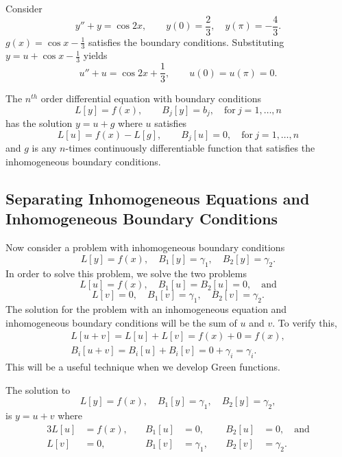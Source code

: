 \begin{Example}
  Consider
  \[ y'' + y = \cos 2x, \qquad y(0) = \frac{2}{3}, \quad y(\pi) = -\frac{4}{3}. \]
  $g(x) = \cos x - \frac{1}{3}$ satisfies the boundary conditions.  Substituting
  $y = u + \cos x - \frac{1}{3}$ yields
  \[ u'' + u = \cos 2x + \frac{1}{3}, \qquad u(0) = u(\pi) = 0. \]
\end{Example}











\begin{Result}
  The $n^{th}$ order differential equation with boundary conditions
  \[
  L[y]=f(x), \qquad B_j[y]=b_j, \quad \mathrm{for}\ j = 1,\ldots,n
  \]
  has the solution $y = u + g$ where $u$ satisfies
  \[
  L[u] = f(x) - L[g], \qquad B_j[u] = 0, \quad \mathrm{for}\ j= 1, \ldots, n
  \]
  and $g$ is any $n$-times continuously differentiable function that satisfies
  the inhomogeneous boundary conditions.
\end{Result}










\subsection{Separating Inhomogeneous Equations and Inhomogeneous Boundary 
  Conditions}

Now consider a problem with inhomogeneous boundary conditions
\[ L[y] = f(x), \quad B_1[y] = \gamma_1, \quad B_2[y] = \gamma_2.\]
In order to solve this problem, we solve the two problems
\[ L[u] = f(x), \quad B_1[u] = B_2[u] = 0, \quad \mathrm{and}\]
\[ L[v] = 0, \quad B_1[v] = \gamma_1, \quad B_2[v] = \gamma_2.\]
The solution for the problem with an inhomogeneous equation and
inhomogeneous boundary conditions will be the sum of $u$ and $v$.
To verify this,
\begin{gather*}
  L[u+v] = L[u] + L[v] = f(x) + 0 = f(x), \\
  B_i[u + v] = B_i[u] + B_i[v] = 0 + \gamma_i = \gamma_i.
\end{gather*}
This will be a useful technique when we develop Green functions.


\begin{Result}
  The solution to
  \[ L[y] = f(x), \quad B_1[y] = \gamma_1, \quad B_2[y] = \gamma_2,\]
  is $y = u + v$ where
  \begin{alignat*}{3}
    L[u] &= f(x), &\quad B_1[u] &= 0, &\quad B_2[u] &= 0, \quad \mathrm{and} \\
    L[v] &= 0, &\quad B_1[v] &= \gamma_1, &\quad B_2[v] &= \gamma_2.
  \end{alignat*}
\end{Result}











